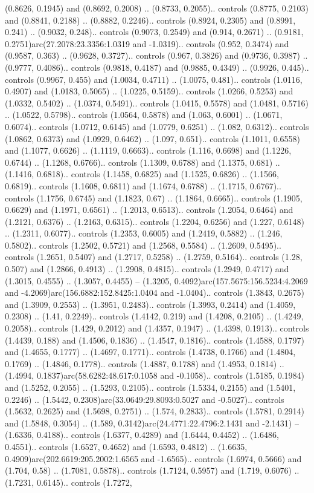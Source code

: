 (0.8626, 0.1945) and (0.8692, 0.2008) .. (0.8733, 0.2055).. controls (0.8775, 0.2103) and (0.8841, 0.2188) .. (0.8882, 0.2246).. controls (0.8924, 0.2305) and (0.8991, 0.241) .. (0.9032, 0.248).. controls (0.9073, 0.2549) and (0.914, 0.2671) .. (0.9181, 0.2751)arc(27.2078:23.3356:1.0319 and -1.0319).. controls (0.952, 0.3474) and (0.9587, 0.363) .. (0.9628, 0.3727).. controls (0.967, 0.3826) and (0.9736, 0.3987) .. (0.9777, 0.4086).. controls (0.9818, 0.4187) and (0.9885, 0.4349) .. (0.9926, 0.445).. controls (0.9967, 0.455) and (1.0034, 0.4711) .. (1.0075, 0.481).. controls (1.0116, 0.4907) and (1.0183, 0.5065) .. (1.0225, 0.5159).. controls (1.0266, 0.5253) and (1.0332, 0.5402) .. (1.0374, 0.5491).. controls (1.0415, 0.5578) and (1.0481, 0.5716) .. (1.0522, 0.5798).. controls (1.0564, 0.5878) and (1.063, 0.6001) .. (1.0671, 0.6074).. controls (1.0712, 0.6145) and (1.0779, 0.6251) .. (1.082, 0.6312).. controls (1.0862, 0.6373) and (1.0929, 0.6462) .. (1.097, 0.651).. controls (1.1011, 0.6558) and (1.1077, 0.6626) .. (1.1119, 0.6663).. controls (1.116, 0.6698) and (1.1226, 0.6744) .. (1.1268, 0.6766).. controls (1.1309, 0.6788) and (1.1375, 0.681) .. (1.1416, 0.6818).. controls (1.1458, 0.6825) and (1.1525, 0.6826) .. (1.1566, 0.6819).. controls (1.1608, 0.6811) and (1.1674, 0.6788) .. (1.1715, 0.6767).. controls (1.1756, 0.6745) and (1.1823, 0.67) .. (1.1864, 0.6665).. controls (1.1905, 0.6629) and (1.1971, 0.6561) .. (1.2013, 0.6513).. controls (1.2054, 0.6464) and (1.2121, 0.6376) .. (1.2163, 0.6315).. controls (1.2204, 0.6256) and (1.227, 0.6148) .. (1.2311, 0.6077).. controls (1.2353, 0.6005) and (1.2419, 0.5882) .. (1.246, 0.5802).. controls (1.2502, 0.5721) and (1.2568, 0.5584) .. (1.2609, 0.5495).. controls (1.2651, 0.5407) and (1.2717, 0.5258) .. (1.2759, 0.5164).. controls (1.28, 0.507) and (1.2866, 0.4913) .. (1.2908, 0.4815).. controls (1.2949, 0.4717) and (1.3015, 0.4555) .. (1.3057, 0.4455) -- (1.3205, 0.4092)arc(157.5675:156.5234:4.2069 and -4.2069)arc(156.6882:152.8425:1.0404 and -1.0404).. controls (1.3843, 0.2675) and (1.3909, 0.2553) .. (1.3951, 0.2483).. controls (1.3993, 0.2414) and (1.4059, 0.2308) .. (1.41, 0.2249).. controls (1.4142, 0.219) and (1.4208, 0.2105) .. (1.4249, 0.2058).. controls (1.429, 0.2012) and (1.4357, 0.1947) .. (1.4398, 0.1913).. controls (1.4439, 0.188) and (1.4506, 0.1836) .. (1.4547, 0.1816).. controls (1.4588, 0.1797) and (1.4655, 0.1777) .. (1.4697, 0.1771).. controls (1.4738, 0.1766) and (1.4804, 0.1769) .. (1.4846, 0.1778).. controls (1.4887, 0.1788) and (1.4953, 0.1814) .. (1.4994, 0.1837)arc(58.6282:48.617:0.1058 and -0.1058).. controls (1.5185, 0.1984) and (1.5252, 0.2055) .. (1.5293, 0.2105).. controls (1.5334, 0.2155) and (1.5401, 0.2246) .. (1.5442, 0.2308)arc(33.0649:29.8093:0.5027 and -0.5027).. controls (1.5632, 0.2625) and (1.5698, 0.2751) .. (1.574, 0.2833).. controls (1.5781, 0.2914) and (1.5848, 0.3054) .. (1.589, 0.3142)arc(24.4771:22.4796:2.1431 and -2.1431) -- (1.6336, 0.4188).. controls (1.6377, 0.4289) and (1.6444, 0.4452) .. (1.6486, 0.4551).. controls (1.6527, 0.4652) and (1.6593, 0.4812) .. (1.6635, 0.4909)arc(202.6619:205.2002:1.6565 and -1.6565).. controls (1.6974, 0.5666) and (1.704, 0.58) .. (1.7081, 0.5878).. controls (1.7124, 0.5957) and (1.719, 0.6076) .. (1.7231, 0.6145).. controls (1.7272, 